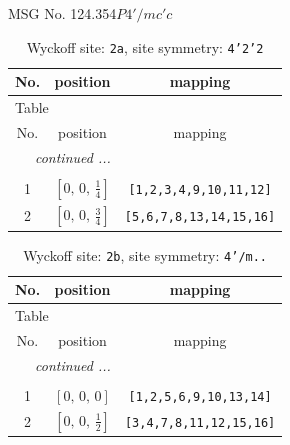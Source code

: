 \documentclass[fleqn,8pt]{jsarticle}
\begin{document}
\setcounter{MaxMatrixCols}{32}

\renewcommand{\tablename}{Table~}
\renewcommand{\figurename}{Figure~}
\begin{center}
\LARGE
MSG No. 124.354\quad$P4'/mc'c$
\end{center}
\renewcommand{\arraystretch}{1.2}
\begin{longtable}{ccc}
\caption{Wyckoff site: {\tt 2a}, site symmetry: {\tt 4'2'2}}
 \\
 \hline \hline
No. & position & mapping \\ \hline \endfirsthead

\multicolumn{2}{l}{\tablename\ \thetable{}} \\
 \hline \hline
No. & position & mapping \\ \hline \endhead

 \hline \hline
\multicolumn{2}{r}{\footnotesize\it continued ...} \\ \endfoot

 \hline \hline
\multicolumn{2}{r}{} \\ \endlastfoot

1 & $\left[ 0,\, 0,\, \frac{1}{4} \right]$ & {\tt [1,2,3,4,9,10,11,12]} \\ \hline
2 & $\left[ 0,\, 0,\, \frac{3}{4} \right]$ & {\tt [5,6,7,8,13,14,15,16]} \\
\end{longtable}
\renewcommand{\arraystretch}{1.2}
\begin{longtable}{ccc}
\caption{Wyckoff site: {\tt 2b}, site symmetry: {\tt 4'/m..}}
 \\
 \hline \hline
No. & position & mapping \\ \hline \endfirsthead

\multicolumn{2}{l}{\tablename\ \thetable{}} \\
 \hline \hline
No. & position & mapping \\ \hline \endhead

 \hline \hline
\multicolumn{2}{r}{\footnotesize\it continued ...} \\ \endfoot

 \hline \hline
\multicolumn{2}{r}{} \\ \endlastfoot

1 & $\left[ 0,\, 0,\, 0 \right]$ & {\tt [1,2,5,6,9,10,13,14]} \\ \hline
2 & $\left[ 0,\, 0,\, \frac{1}{2} \right]$ & {\tt [3,4,7,8,11,12,15,16]} \\
\end{longtable}
\end{document}
